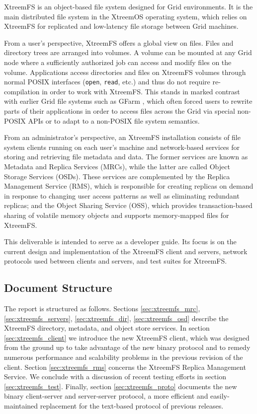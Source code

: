 XtreemFS \cite{XtreemFS} is an object-based \cite{objStore,mesnier03objectbased} file system designed for Grid environments. It is the main distributed file system in the XtreemOS operating system, which relies on XtreemFS for replicated and low-latency file storage between Grid machines.

From a user's perspective, XtreemFS offers a global view on files. Files and directory trees are arranged into volumes. A volume can be mounted at any Grid node where a sufficiently authorized job can access and modify files on the volume. Applications access directories and files on XtreemFS volumes through normal POSIX interfaces (\texttt{open}, \texttt{read}, etc.) and thus do not require re-compilation in order to work with XtreemFS. This stands in marked contrast with earlier Grid file systems such as GFarm \cite{gfarm2}, which often forced users to rewrite parts of their applications in order to access files across the Grid via special non-POSIX APIs or to adapt to a non-POSIX file system semantics.

From an administrator's perspective, an XtreemFS installation consists of file system clients running on each user's machine and network-based services for storing and retrieving file metadata and data. The former services are known as Metadata and Replica Services (MRCs), while the latter are called Object Storage Services (OSDs). These services are complemented by the Replica Management Service (RMS), which is responsible for creating replicas on demand in response to changing user access patterns as well as eliminating redundant replicas; and the Object Sharing Service (OSS), which provides transaction-based sharing of volatile memory objects and supports memory-mapped files for XtreemFS.

This deliverable is intended to serve as a developer guide. Its focus is on the current design and implementation of the XtreemFS client and servers, network protocols used between clients and servers, and test suites for XtreemFS.

\subsection{Document Structure}

The report is structured as follows. Sections \ref{sec:xtreemfs_mrc}, \ref{sec:xtreemfs_servers}, \ref{sec:xtreemfs_dir}, \ref{sec:xtreemfs_osd} describe the XtreemFS directory, metadata, and object store services. In section \ref{sec:xtreemfs_client} we introduce the new XtreemFS client, which was designed from the ground up to take advantage of the new binary protocol and to remedy numerous performance and scalability problems in the previous revision of the client. Section \ref{sec:xtreemfs_rms} concerns the XtreemFS Replica Management Service. We conclude with a discussion of recent testing efforts in section \ref{sec:xtreemfs_test}. Finally, section \ref{sec:xtreemfs_proto} documents the new binary client-server and server-server protocol, a more efficient and easily-maintained replacement for the text-based protocol of previous releases.
